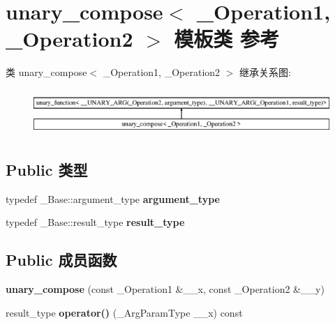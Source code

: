 \hypertarget{classunary__compose}{}\section{unary\+\_\+compose$<$ \+\_\+\+Operation1, \+\_\+\+Operation2 $>$ 模板类 参考}
\label{classunary__compose}
类 unary\+\_\+compose$<$ \+\_\+\+Operation1, \+\_\+\+Operation2 $>$ 继承关系图\+:\begin{figure}[H]
\begin{center}
\leavevmode
\includegraphics[height=1.772152cm]{classunary__compose}
\end{center}
\end{figure}
\subsection*{Public 类型}
\begin{DoxyCompactItemize}
\item 
\mbox{\label{classunary__compose_a93e41e14e42cf26eda510bad1bd208ab}} 
typedef \+\_\+\+Base\+::argument\+\_\+type {\bfseries argument\+\_\+type}
\item 
\mbox{\label{classunary__compose_a229f43d73b3b2869b37669ca22b0c54e}} 
typedef \+\_\+\+Base\+::result\+\_\+type {\bfseries result\+\_\+type}
\end{DoxyCompactItemize}
\subsection*{Public 成员函数}
\begin{DoxyCompactItemize}
\item 
\mbox{\label{classunary__compose_a6bffa3254473163c626c3a1f8e698ab6}} 
{\bfseries unary\+\_\+compose} (const \+\_\+\+Operation1 \&\+\_\+\+\_\+x, const \+\_\+\+Operation2 \&\+\_\+\+\_\+y)
\item 
\mbox{\label{classunary__compose_aeae4dd22eca9f27ce95876c3f16995a9}} 
result\+\_\+type {\bfseries operator()} (\+\_\+\+Arg\+Param\+Type \+\_\+\+\_\+x) const
\end{DoxyCompactItemize}
